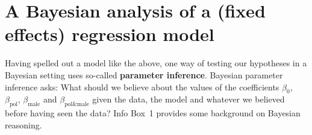 \documentclass[nobib]{tufte-handout}
\newcommand{\tr}[1]{\textcolor{DarkOrange}{[tr: #1]}}
\begin{document}
%
%
%    


\section{A Bayesian analysis of a (fixed effects) regression model}

Having spelled out a model like the above, one way of testing our hypotheses in a Bayesian setting uses so-called \textbf{parameter inference}.
%
%
Bayesian parameter inference asks: What should we believe about the values of the coefficients $\beta_0$, $\beta_{\text{pol}}$, $\beta_{\text{male}}$ and $\beta_{\text{pol\&male}}$ given the data, the model and whatever we believed before having seen the data? Info Box~1 provides some background on Bayesian reasoning.
\end{document}
